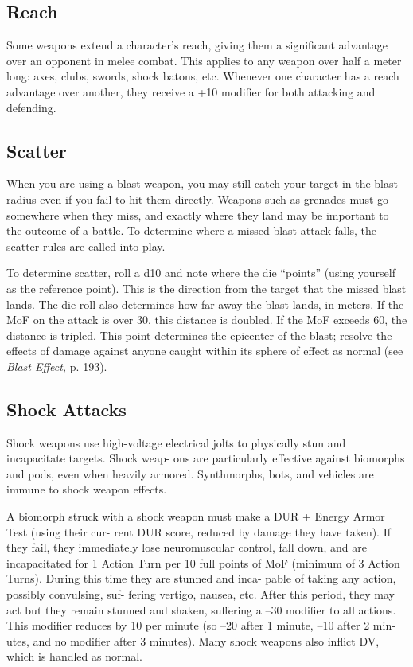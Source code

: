 \subsection{Reach}

Some weapons extend a character's reach, giving 
them a significant advantage over an opponent in 
melee combat. This applies to any weapon over half 
a meter long: axes, clubs, swords, shock batons, etc. 
Whenever one character has a reach advantage over 
another, they receive a +10 modifier for both attacking 
and defending.

\subsection{Scatter}

When you are using a blast weapon, you may still 
catch your target in the blast radius even if you fail to 
hit them directly. Weapons such as grenades must go 
somewhere when they miss, and exactly where they 
land may be important to the outcome of a battle. To 
determine where a missed blast attack falls, the scatter 
rules are called into play.

To determine scatter, roll a d10 and note where the 
die ``points'' (using yourself as the reference point). 
This is the direction from the target that the missed 
blast lands. The die roll also determines how far away 
the blast lands, in meters. If the MoF on the attack is 
over 30, this distance is doubled. If the MoF exceeds 
60, the distance is tripled. This point determines the 
epicenter of the blast; resolve the effects of damage 
against anyone caught within its sphere of effect as 
normal (see \textit{Blast Effect,} p. 193).

\subsection{Shock Attacks}

Shock weapons use high-voltage electrical jolts to 
physically stun and incapacitate targets. Shock weap-
ons are particularly effective against biomorphs and 
pods, even when heavily armored. Synthmorphs, bots, 
and vehicles are immune to shock weapon effects.

A biomorph struck with a shock weapon must 
make a DUR + Energy Armor Test (using their cur-
rent DUR score, reduced by damage they have taken). 
If they fail, they immediately lose neuromuscular 
control, fall down, and are incapacitated for 1 Action 
Turn per 10 full points of MoF (minimum of 3 Action 
Turns). During this time they are stunned and inca-
pable of taking any action, possibly convulsing, suf-
fering vertigo, nausea, etc. After this period, they may 
act but they remain stunned and shaken, suffering a 
–30 modifier to all actions. This modifier reduces by 
10 per minute (so –20 after 1 minute, –10 after 2 min-
utes, and no modifier after 3 minutes). Many shock 
weapons also inflict DV, which is handled as normal.

